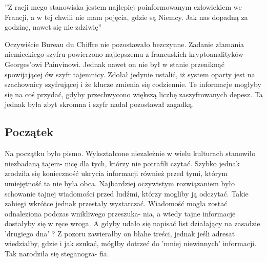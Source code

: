 \documentclass[a4paper]{article}
\begin{document}
\begin{center}
”Z racji mego stanowiska jestem najlepiej poinformowanym człowiekiem we Francji, a w tej chwili
nie mam pojęcia, gdzie są Niemcy. Jak nas dopadną za godzinę, nawet się nie zdziwię” \cite{1}
\end{center}

Oczywiście Bureau du Chiffre nie pozostawało bezczynne. Zadanie złamania niemieckiego szyfru
powierzono najlepszemu z francuskich kryptoanalityków — Georges’owi Painvinowi. Jednak nawet
on nie był w stanie przeniknąć spowijającej ów szyfr tajemnicy. Zdołał jedynie ustalić, iż system
oparty jest na szachownicy szyfrującej i że klucze zmienia się codziennie. Te informacje mogłyby się
na coś przydać, gdyby przechwycono większą liczbę zaszyfrowanych depesz. Ta jednak była zbyt
skromna i szyfr nadal pozostawał zagadką.

\subsection{Początek}
Na początku było pismo. Wykształcone niezależnie w wielu kulturach stanowiło niezbadaną tajem-
nicę dla tych, którzy nie potrafili czytać. Szybko jednak zrodziła się konieczność ukrycia informacji
również przed tymi, którym umiejętność ta nie była obca. Najbardziej oczywistym rozwiązaniem
było schowanie tajnej wiadomości przed ludźmi, którzy mogliby ją odczytać. Takie zabiegi wkrótce
jednak przestały wystarczać. Wiadomość mogła zostać odnaleziona podczas wnikliwego przeszuka-
nia, a wtedy tajne informacje dostałyby się w ręce wroga. A gdyby udało się napisać list działający
na zasadzie ’drugiego dna’ ? Z pozoru zawierałby on błahe treści, jednak jeśli adresat wiedziałby,
gdzie i jak szukać, mógłby dotrzeć do ’mniej niewinnych’ informacji. Tak narodziła się steganogra-
fia.
\end{document}
